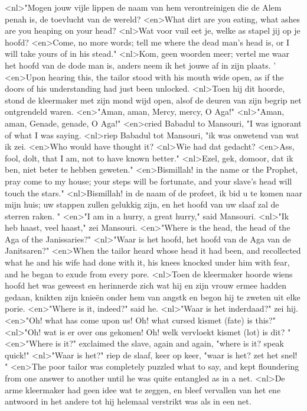 <nl>"Mogen jouw vijle lippen de naam van hem verontreinigen die de Alem penah is, de toevlucht van de wereld?
<en>What dirt are you eating, what ashes are you heaping on your head?
<nl>Wat voor vuil eet je, welke as stapel jij op je hoofd?
<en>Come, no more words; tell me where the dead man's head is, or I will take yours of in his stead."
<nl>Kom, geen woorden meer; vertel me waar het hoofd van de dode man is, anders neem ik het jouwe af in zijn plaats. '
<en>Upon hearing this, the tailor stood with his mouth wide open, as if the doors of his understanding had just been unlocked.
<nl>Toen hij dit hoorde, stond de kleermaker met zijn mond wijd open, alsof de deuren van zijn begrip net ontgrendeld waren.
<en>"Aman, aman, Mercy, mercy, O Aga!"
<nl>"Aman, aman, Genade, genade, O Aga!"
<en>cried Babadul to Mansouri, "I was ignorant of what I was saying.
<nl>riep Babadul tot Mansouri, "ik was onwetend van wat ik zei.
<en>Who would have thought it?
<nl>Wie had dat gedacht?
<en>Ass, fool, dolt, that I am, not to have known better."
<nl>Ezel, gek, domoor, dat ik ben, niet beter  te hebben geweten."
<en>Bismillah! in the name or the Prophet, pray come to my house; your steps will be fortunate, and your slave's head will touch the stars."
<nl>Bismillah! in de naam of de profeet, ik bid  u te komen naar mijn huis; uw stappen zullen gelukkig zijn, en het hoofd van uw slaaf zal de sterren raken. "
<en>"I am in a hurry, a great hurry," said Mansouri.
<nl>"Ik heb haast, veel haast," zei Mansouri.
<en>"Where is the head, the head of the Aga of the Janissaries?"
<nl>"Waar is het hoofd, het hoofd van de Aga van de Janitsaren?"
<en>When the tailor heard whose head it had been, and recollected what he and his wife had done with it, his knees knocked under him with fear, and he began to exude from every pore.
<nl>Toen de kleermaker hoorde wiens hoofd het was geweest en herinnerde zich wat hij en zijn vrouw ermee hadden gedaan, knikten zijn knieën onder hem van angstk en begon hij te zweten uit elke porie.
<en>"Where is it, indeed?" said he.
<nl>"Waar is het inderdaad?" zei hij.
<en>"Oh! what has come upon us! Oh! what cursed kismet (fate) is this?"
<nl>"Oh! wat is er over ons gekomen! Oh! welk vervloekt kismet (lot) is dit? "
<en>"Where is it?" exclaimed the slave, again and again, "where is it? speak quick!"
<nl>"Waar is het?" riep de slaaf, keer op keer, "waar is het? zet het  snel! "
<en>The poor tailor was completely puzzled what to say, and kept floundering from one answer to another until he was quite entangled as in a net.
<nl>De arme kleermaker had geen idee  wat te zeggen, en bleef vervallen van het ene antwoord in het andere tot hij helemaal verstrikt was als in een net.
